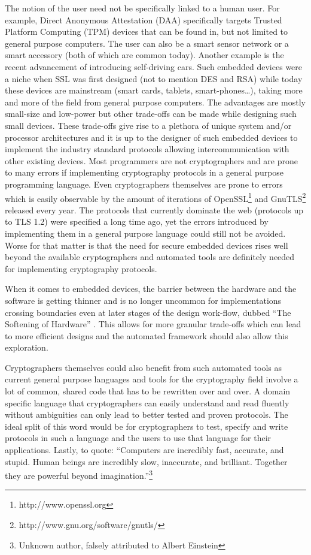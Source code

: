The notion of the user need not be specifically linked to a human
user. For example, Direct Anonymous Attestation (DAA) specifically
targets Trusted Platform Computing (TPM) devices that can be found in,
but not limited to general purpose computers. The user can also be a
smart sensor network or a smart accessory (both of which are common
today). Another example is the recent advancement of introducing
self-driving cars. Such embedded devices were a niche when SSL was
first designed (not to mention DES and RSA) while today these devices
are mainstream (smart cards, tablets, smart-phones\ldots), taking more
and more of the field from general purpose computers. The advantages
are mostly small-size and low-power but other trade-offs can be made
while designing such small devices. These trade-offs give rise to a
plethora of unique system and/or processor architectures and it is up
to the designer of such embedded devices to implement the industry
standard protocols allowing intercommunication with other existing
devices. Most programmers are not cryptographers and are prone to many
errors if implementing cryptography protocols in a general purpose
programming language.  Even cryptographers themselves are prone to
errors which is easily observable by the amount of iterations of
OpenSSL\footnote{http://www.openssl.org} and
GnuTLS\footnote{http://www.gnu.org/software/gnutls/} released every
year. The protocols that currently dominate the web (protocols up to
TLS 1.2) were specified a long time ago, yet the errors introduced by
implementing them in a general purpose language could still not be
avoided. Worse for that matter is that the need for secure embedded
devices rises well beyond the available cryptographers and automated
tools are definitely needed for implementing cryptography protocols.

When it comes to embedded devices, the barrier between the hardware
and the software is getting thinner and is no longer uncommon for
implementations crossing boundaries even at later stages of the design
work-flow, dubbed ``The Softening of Hardware''
\cite{softeninghw}. This allows for more granular trade-offs which can
lead to more efficient designs and the automated framework should also
allow this exploration.

Cryptographers themselves could also benefit from such automated tools
as current general purpose languages and tools for the cryptography
field involve a lot of common, shared code that has to be rewritten
over and over. A domain specific language that cryptographers can
easily understand and read fluently without ambiguities can only lead
to better tested and proven protocols. The ideal split of this word
would be for cryptographers to test, specify and write protocols in
such a language and the users to use that language for their
applications. Lastly, to quote: ``Computers are incredibly fast,
accurate, and stupid. Human beings are incredibly slow, inaccurate,
and brilliant. Together they are powerful beyond
imagination.''\footnote{Unknown author, falsely attributed to Albert
  Einstein}

